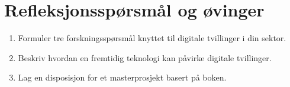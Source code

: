 \section{Refleksjonsspørsmål og øvinger}
\begin{enumerate}
    \item Formuler tre forskningsspørsmål knyttet til digitale tvillinger i din sektor.
    \item Beskriv hvordan en fremtidig teknologi kan påvirke digitale tvillinger.
    \item Lag en disposisjon for et masterprosjekt basert på boken.
\end{enumerate}
